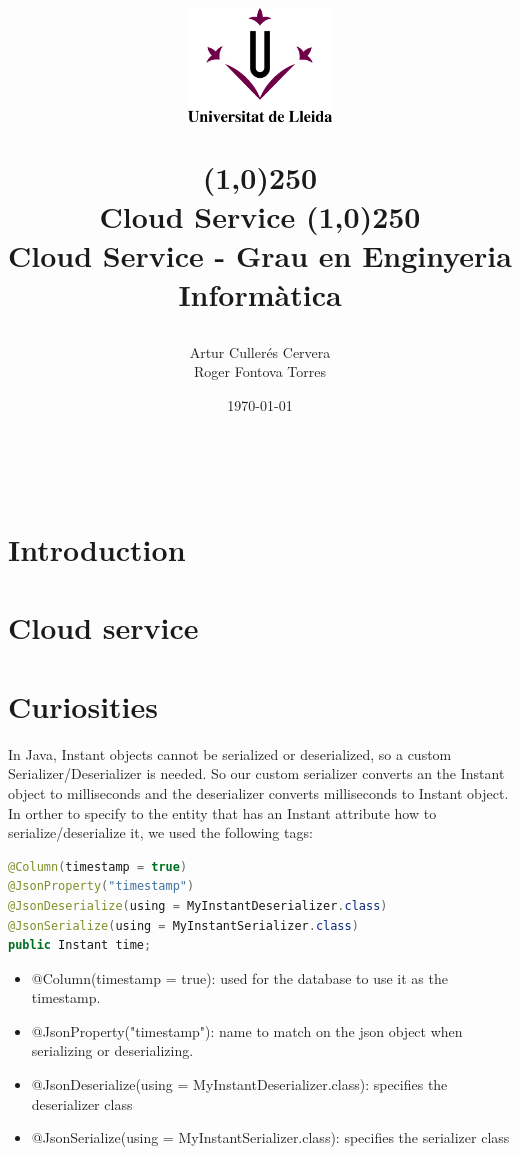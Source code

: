 \documentclass[12pt, letterpaper]{article}
\title{%
    \begin{center}
	\includegraphics[width=4cm,height=3cm]{udl.png}
    \end{center}
    \line(1,0){250}\\[0.3cm]
    \textbf{Cloud Service}
    \line(1,0){250}
    \\[0.5cm]
	\large Cloud Service - Grau en Enginyeria Informàtica
}
\author{Artur Cullerés Cervera \\ Roger Fontova Torres}
\date{\today}
\begin{document}
    
\maketitle
\thispagestyle{empty}
\newpage
\tableofcontents
\listoffigures
\newpage
\
\newpage


\section{Introduction}
\label{sections:introduction}


\section{Cloud service}
\label{sections:cloud-service}


\section{Curiosities}
In Java, Instant objects cannot be serialized or deserialized, so a custom Serializer/Deserializer is needed. So our custom serializer converts an the Instant object to milliseconds and the deserializer converts milliseconds to Instant object. In orther to specify to the entity that has an Instant attribute how to serialize/deserialize it, we used the following tags: \\

\begin{lstlisting}[language=java]
@Column(timestamp = true)
@JsonProperty("timestamp")
@JsonDeserialize(using = MyInstantDeserializer.class)
@JsonSerialize(using = MyInstantSerializer.class)
public Instant time;

\end{lstlisting}


\begin{itemize}
  \item @Column(timestamp = true): used for the database to use it as the timestamp.
  \item @JsonProperty("timestamp"): name to match on the json object when serializing or deserializing.
  \item @JsonDeserialize(using = MyInstantDeserializer.class): specifies the deserializer class
  \item @JsonSerialize(using = MyInstantSerializer.class): specifies the serializer class
\end{itemize}
\end{document}
